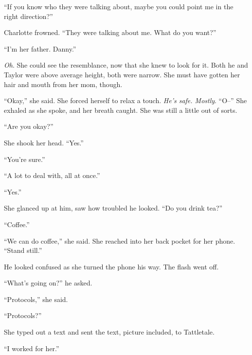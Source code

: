 ``If you know who they were talking about, maybe you could point me in the right direction?''



Charlotte frowned.  ``They were talking about me.  What do you want?''



``I'm her father.  Danny.''



\emph{Oh}.  She could see the resemblance, now that she knew to look for it.  Both he and Taylor were above average height, both were narrow.  She must have gotten her hair and mouth from her mom, though.



``Okay,'' she said.  She forced herself to relax a touch.  \emph{He's safe.  Mostly}.  ``O--''  She exhaled as she spoke, and her breath caught.  She was still a little out of sorts.



``Are you okay?''



She shook her head.  ``Yes.''



``You're sure.''



``A lot to deal with, all at once.''



``Yes.''



She glanced up at him, saw how troubled he looked.  ``Do you drink tea?''



``Coffee.''



``We can do coffee,'' she said.  She reached into her back pocket for her phone.  ``Stand still.''



He looked confused as she turned the phone his way.  The flash went off.



``What's going on?'' he asked.



``Protocols,'' she said.



``Protocols?''



She typed out a text and sent the text, picture included, to Tattletale.



``I worked for her.''



